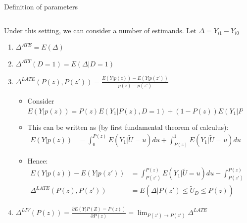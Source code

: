 \documentclass[notes,11pt, aspectratio=169]{beamer}
\newenvironment{wideitemize}{\itemize\addtolength{\itemsep}{10pt}}{\enditemize}
\begin{document}
\begin{frame}{Definition of parameters}
  \begin{columns}[T] %
    \begin{column}{0.95\textwidth}
      \begin{wideitemize}
      \item Under this setting, we can consider a number of estimands. Let $\Delta = Y_{i1} - Y_{i0}$
        \begin{enumerate}
        \item $\Delta^{ATE} = E(\Delta)$
        \item $\Delta^{ATT}(D = 1) = E(\Delta | D = 1)$
        \item $\Delta^{LATE}(P(z), P(z')) = \frac{E(Y| p(z)) - E(Y| p(z'))}{p(z) - p(z')}$
          \begin{itemize}
          \item Consider $E(Y | p(z)) = P(z) E(Y_{1} | P(z), D = 1) + (1-  P(z)) E(Y_{1} | P(z), D = 1)$
          \item This can be written as (by first fundamental theorem of calculus):
            \begin{align*}
              E(Y | p(z)) &= \int_{0}^{P(z)}E(Y_{1} | \widetilde{U} = u) du + \int_{P(z)}^{1}E(Y_{1} | \widetilde{U} = u) du
            \end{align*}
          \item Hence:
            \begin{align*}
              E(Y | p(z)) - E(Y | p(z'))  &= \int_{P(z')}^{P(z)}E(Y_{1} | \widetilde{U} = u) du -  \int_{P(z')}^{P(z)}E(Y_{1} | \widetilde{U} = u) du\\
              \Delta^{LATE}(P(z), P(z')) &= E(\Delta | P(z') \leq \widetilde{U}_{D} \leq P(z))
            \end{align*}

          \end{itemize}
        \item $\Delta^{LIV}(P(z)) = \frac{\partial E(Y | P(Z) = P(z))}{\partial P(z)} = \lim_{P(z') \rightarrow P(z')} \Delta^{LATE}$
        \end{enumerate}
      \end{wideitemize}
\end{column}
\begin{column}{0.4\textwidth}
\end{column}
\end{columns}
\end{frame}
\end{document}
